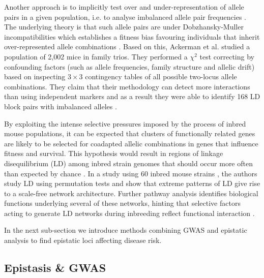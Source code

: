Another approach is to implicitly test over and under-representation of allele pairs in a given population, i.e. to analyse imbalanced allele pair frequencies \cite{ackermann2012systematic}.
The underlying theory is that such allele pairs are under Dobzhansky-Muller incompatibilities which establishes a fitness bias favouring individuals that inherit over-represented allele combinations \cite{ackermann2012systematic}.
Based on this, Ackerman et al. \cite{ackermann2012systematic} studied a population of 2,002 mice in family trios.
They performed a $\chi^2$ test correcting by confounding factors (such as allele frequencies, family structure and allelic drift) based on inspecting $3 \times 3$ contingency tables of all possible two-locus allele combinations.
They claim that their methodology can detect more interactions than using independent markers and as a result they were able to identify 168 LD block pairs with imbalanced alleles \cite{ackermann2012systematic}.

By exploiting the  intense selective pressures imposed by the process of inbred mouse populations, it can be expected that clusters of functionally related genes are likely to be selected for coadapted allelic combinations in genes that influence fitness and survival.
This hypothesis would result in regions of linkage disequilibrium (LD) among inbred strain genomes that should occur more often than expected by chance \cite{petkov2005evidence}.
In a study using 60 inbred mouse strains \cite{petkov2005evidence}, the authors study LD using permutation tests and show that extreme patterns of LD give rise to a scale-free network architecture.
Further pathway analysis identifies biological functions underlying several of these networks, hinting that selective factors acting to generate LD networks during inbreeding reflect functional interaction \cite{petkov2005evidence}.

In the next sub-section we introduce methods combining GWAS and epistatic analysis to find epistatic loci affecting disease risk.

\subsection{Epistasis \& GWAS}

